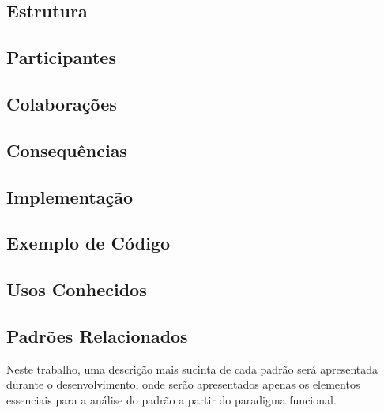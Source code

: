\subsection{Estrutura}

\subsection{Participantes}

\subsection{Colaborações}

\subsection{Consequências}

\subsection{Implementação}

\subsection{Exemplo de Código}

\subsection{Usos Conhecidos}

\subsection{Padrões Relacionados}



Neste trabalho, uma descrição mais sucinta de cada 
padrão será apresentada durante o desenvolvimento, onde 
serão apresentados apenas os elementos essenciais para 
a análise do padrão a partir do paradigma funcional.